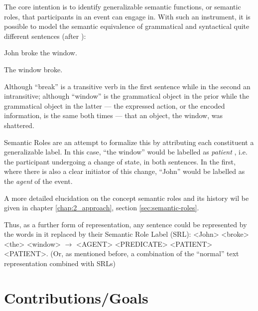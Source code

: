 The core intention is to identify generalizable semantic functions, or semantic roles,
that participants in an event can engage in. With such an instrument, it is possible to
model the semantic equivalence of grammatical and syntactical quite different sentences
(after \cite{palmer2010semantic}):

\begin{examples}
  \item John broke the window.
  \item The window broke.
\end{examples}

Although ``break'' is a transitive verb in the first sentence while in the second an intransitive;
although ``window'' is the grammatical object in the prior while the grammatical object in the
latter --- the expressed action, or the encoded information, is the same both times --- that an
object, the window, was shattered.

Semantic Roles are an attempt to formalize this by attributing each constituent
a generalizable label. In this case, ``the window'' would be labelled as \emph{patient}
, i.e. the participant undergoing a change of state, in both sentences.
In the first, where there is also a clear initiator of this change, ``John''
would be labelled as the \emph{agent} of the event.

A more detailed elucidation on the concept semantic roles and its history wil be
given in chapter \ref{chap:2_approach}, section \ref{sec:semantic-roles}.

Thus, as a further form of representation, any sentence could be represented by the words in it
replaced by their Semantic Role Label (SRL): <John> <broke> <the> <window> $\rightarrow$ <AGENT>
<PREDICATE> <PATIENT> <PATIENT>. (Or, as mentioned before, a combination of the ``normal'' text
representation combined with SRLs)




\section{Contributions/Goals}

